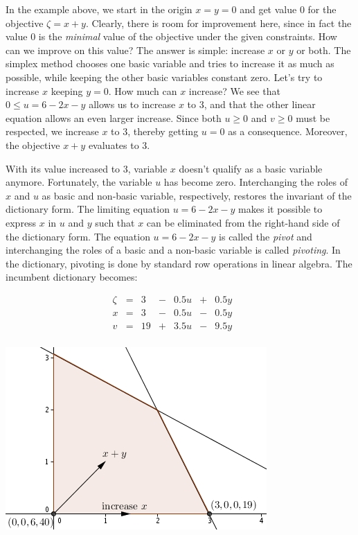 \documentclass[ukenglish]{nik}
\begin{document}
In the example above, we start in the origin $x=y=0$ and get
value $0$ for the objective $\zeta = x + y$.
Clearly, there is room for improvement here, since in fact
the value $0$ is the \emph{minimal} value of the objective
under the given constraints. How can we improve on this
value? The answer is simple: increase $x$ or $y$ or both.
The simplex method chooses one basic variable and
tries to increase it as much as possible, while keeping the
other basic variables constant zero.
Let's try to increase $x$ keeping $y=0$. How much can $x$ increase?
We see that $0 \leq u = 6 -2x-y$ allows us to increase $x$ to $3$,
and that the other linear equation allows an even larger increase. Since both
$u\geq 0$ and $v\geq 0$ must be respected, we increase $x$ to $3$,
thereby getting $u=0$ as a consequence. Moreover, the objective $x+y$ evaluates to 3.

With its value increased to $3$, variable $x$ doesn't qualify as a basic variable anymore.
Fortunately, the variable $u$ has become zero. Interchanging the roles of
$x$ and $u$ as basic and non-basic variable, respectively, restores 
the invariant of the dictionary form. The limiting equation $u = 6 -2x-y$ makes it
possible to express $x$ in $u$ and $y$ such that $x$ can be eliminated from the
right-hand side of the dictionary form. The equation $u = 6 -2x-y$ is
called the \emph{pivot} and interchanging the roles of
a basic and a non-basic variable is called \emph{pivoting}.
In the dictionary, pivoting is done by standard row operations in linear algebra. 
The incumbent dictionary becomes:

	\begin{minipage}{.45\textwidth}
\[    
    \begin{array}{lcrcrcrcr}
      \zeta&=& 3 &-& 0.5 u &+& 0.5 y & &  \\\hline
      x    &=& 3 &-& 0.5 u &-& 0.5 y & &  \\
      v    &=& 19&+& 3.5 u &-& 9.5 y & &  \\

    \end{array}
\]
\end{minipage}
	\begin{minipage}{.45\textwidth}
				\includegraphics{ex2.jpg}
\end{minipage}
\vspace{.2cm}
\end{document}
